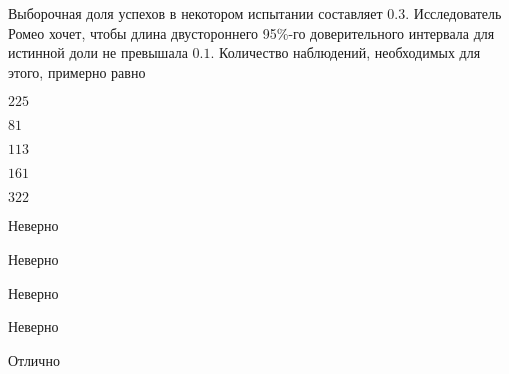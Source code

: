 
\begin{question}
Выборочная доля успехов в некотором испытании составляет \(0.3\).
Исследователь Ромео хочет, чтобы длина двустороннего 95\%-го
доверительного интервала для истинной доли не превышала \(0.1\).
Количество наблюдений, необходимых для этого, примерно равно
\begin{answerlist}
  \item \(225\)
  \item \(81\)
  \item \(113\)
  \item \(161\)
  \item \(322\)
\end{answerlist}
\end{question}

\begin{solution}
\begin{answerlist}
  \item Неверно
  \item Неверно
  \item Неверно
  \item Неверно
  \item Отлично
\end{answerlist}
\end{solution}

